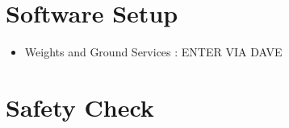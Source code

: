
\def\mytitle{CRJ-700\slash 900 (Delta VATSIM CRJ)}
\def\myauthor{}
\def\mydate{15 April 2018}


\chapter{Software Setup}
\label{softwaresetup}

\begin{itemize}
\item Weights and Ground Services : ENTER VIA DAVE

\end{itemize}

\chapter{Safety Check}
\label{safetycheck}

